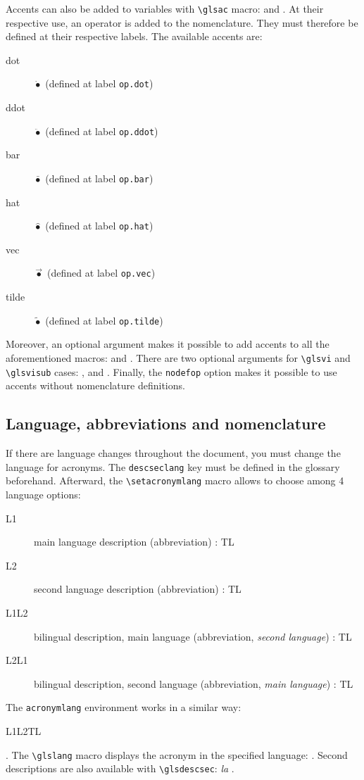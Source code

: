 \documentclass[projet,nohyperref,article,english,french]{ulthese}
\begin{document}
Accents can also be added to variables with \texttt{\textbackslash glsac} macro:  and . At their respective use, an operator is added to the nomenclature. They must therefore be defined at their respective labels. The available accents are:
\begin{description} 
\item[dot] $\dot{\bullet}$ (defined at label \texttt{op.dot})
\item[ddot] $\ddot{\bullet}$ (defined at label \texttt{op.ddot})
\item[bar] $\bar{\bullet}$ (defined at label \texttt{op.bar})
\item[hat] $\widehat{\bullet}$ (defined at label \texttt{op.hat})
\item[vec] $\vec{\bullet}$ (defined at label \texttt{op.vec})
\item[tilde] $\widetilde{\bullet}$ (defined at label \texttt{op.tilde})
\end{description}
Moreover, an optional argument makes it possible to add accents to all the aforementioned macros:  and . There are two optional arguments for \texttt{\textbackslash glsvi} and \texttt{\textbackslash glsvisub} cases: ,  and . Finally, the \texttt{nodefop} option makes it possible to use accents without nomenclature definitions.

\subsection{Language, abbreviations and nomenclature}
If there are language changes throughout the document, you must change the language for acronyms. The \texttt{descseclang} key must be defined in the glossary beforehand. Afterward, the \texttt{\textbackslash setacronymlang} macro allows to choose among 4 language options:
\begin{description}
	\item[L1] main language description (abbreviation) : \acrfull{TL}
	\item[L2] second language description (abbreviation) : \acrfull{TL}
	\item[L1L2] bilingual description, main language (abbreviation, \textit{second language}) : \acrfull{TL}
	\item[L2L1] bilingual description, second language (abbreviation, \textit{main language}) : \acrfull{TL}
\end{description}
The \texttt{acronymlang} environment works in a similar way: \begin{acronymlang}{L1L2}\acrfull{TL}\end{acronymlang}. The \texttt{\textbackslash glslang} macro displays the acronym in the specified language: . Second descriptions are also available with \texttt{\textbackslash glsdescsec}: \textit{la }.
\end{document}
